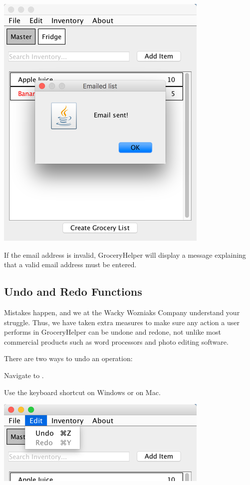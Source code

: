 \documentclass[letterpaper,12pt]{article}
\renewenvironment{enumerate}[1]{\begin{compactenum}#1}{\end{compactenum}}
\begin{document}
	\centerline{\includegraphics[scale=0.5]{16.png}}


If the email address is invalid, GroceryHelper will display a message explaining that a valid email address must be entered.





	\subsection{Undo and Redo Functions}
	
	Mistakes happen, and we at the Wacky Wozniaks Company understand your struggle. Thus, we have taken extra measures to make sure any action a user performs in GroceryHelper can be undone and redone, not unlike most commercial products such as word processors and photo editing software. 
	
	There are two ways to undo an operation:

\begin{enumerate}
\item Navigate to .
\item Use the keyboard shortcut  on Windows or  on Mac.\\
\end{enumerate}	
	
\centerline{\includegraphics[scale=0.5]{07.png}}	
	
\end{document}
